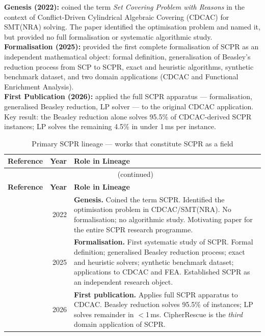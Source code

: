 \documentclass[11pt,a4paper]{report}
\begin{document}
\begin{tcolorbox}[enhanced, colback=lightpurple!20, colframe=purple, arc=4pt, title={Primary SCPR Lineage --- Three Works in Chronological Order}, fonttitle=\bfseries]
\textbf{Genesis (2022):} \citet{sadeghimanesh2022smt} coined the term \emph{Set Covering Problem with Reasons} in the context of Conflict-Driven Cylindrical Algebraic Covering (CDCAC) for SMT(NRA) solving. The paper identified the optimisation problem and named it, but provided no full formalisation or systematic algorithmic study.\\[6pt]
\textbf{Formalisation (2025):} \citet{babatunde2025thesis} provided the first complete formalisation of SCPR as an independent mathematical object: formal definition, generalisation of Beasley's reduction process from SCP to SCPR, exact and heuristic algorithms, synthetic benchmark dataset, and two domain applications (CDCAC and Functional Enrichment Analysis).\\[6pt]
\textbf{First Publication (2026):} \citet{babatunde2026arxiv} applied the full SCPR apparatus --- formalisation, generalised Beasley reduction, LP solver --- to the original CDCAC application. Key result: the Beasley reduction alone solves 95.5\% of CDCAC-derived SCPR instances; LP solves the remaining 4.5\% in under 1\,ms per instance.
\end{tcolorbox}

\begin{longtable}{@{}p{7cm}rp{5.5cm}@{}}
\caption{Primary SCPR lineage --- works that constitute SCPR as a field}\label{tab:scprlineage}\\
\toprule \textbf{Reference} & \textbf{Year} & \textbf{Role in Lineage} \\ \midrule
\endfirsthead
\multicolumn{3}{c}{\tablename\ \thetable{} (continued)}\\ \toprule \textbf{Reference} & \textbf{Year} & \textbf{Role in Lineage} \\ \midrule
\endhead
\citet{sadeghimanesh2022smt} & 2022 & \textbf{Genesis.} Coined the term SCPR. Identified the optimisation problem in CDCAC/SMT(NRA). No formalisation; no algorithmic study. Motivating paper for the entire SCPR research programme. \\[4pt]
\citet{babatunde2025thesis} & 2025 & \textbf{Formalisation.} First systematic study of SCPR. Formal definition; generalised Beasley reduction process; exact and heuristic solvers; synthetic benchmark dataset; applications to CDCAC and FEA. Established SCPR as an independent research object. \\[4pt]
\citet{babatunde2026arxiv} & 2026 & \textbf{First publication.} Applies full SCPR apparatus to CDCAC. Beasley reduction solves 95.5\% of instances; LP solves remainder in $<$1\,ms. CipherRescue is the \emph{third} domain application of SCPR. \\
\bottomrule
\end{longtable}
\end{document}
